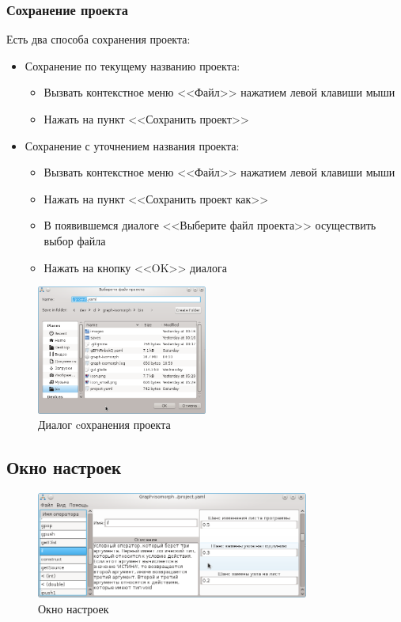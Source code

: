 \documentclass[russian,utf8,emptystyle]{eskdtext}
\begin{document}
\subsubsection{Сохранение проекта}
Есть два способа сохранения проекта:
\begin{itemize}
\item Сохранение по текущему названию проекта:
\begin{itemize}
\item Вызвать контекстное меню <<Файл>> нажатием левой клавиши мыши
\item Нажать на пункт <<Сохранить проект>>
\end{itemize}
\item Сохранение с уточнением названия проекта:
\begin{itemize}
\item Вызвать контекстное меню <<Файл>> нажатием левой клавиши мыши
\item Нажать на пункт <<Сохранить проект как>>
\item В появившемся диалоге <<Выберите файл проекта>> осуществить выбор файла
\item Нажать на кнопку <<OK>> диалога
\end{itemize}
\end{itemize}

\begin{figure}[h!]
\centering
\includegraphics[width=0.5\textwidth]{screen06}
\caption{Диалог cохранения проекта}
\end{figure}

\subsection{Окно настроек}

\begin{figure}[h!]
\centering
\includegraphics[width=0.8\textwidth]{screen07}
\caption{Окно настроек}
\end{figure}
\end{document}
